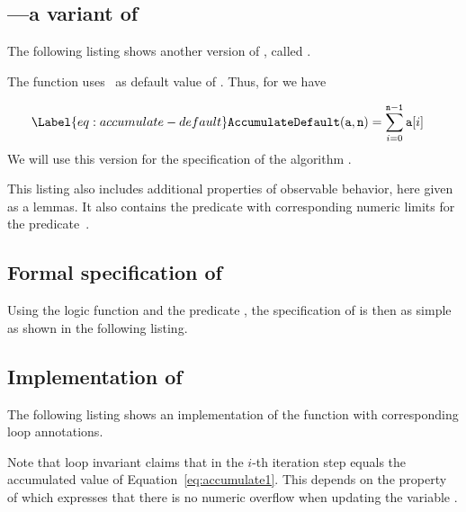 
\subsection{\AccumulateDefault ---a variant of \Accumulate}

The following listing shows another version of ,
called .



The function \AccumulateDefault uses~ as default value of .
Thus, for \AccumulateDefault we have

\begin{align}
\Label{eq:accumulate-default}
    \mathtt{AccumulateDefault}(\mathtt{a}, \mathtt{n})
    &= \sum_{i = 0}^{\mathtt{n-1}} \mathtt{a}[i]
\end{align}
We will use this version for the specification of the algorithm .

This listing also includes additional properties of observable
\AccumulateDefault behavior, here given as a lemmas.
It also contains the predicate 
with corresponding numeric limits for the predicate~\AccumulateDefault.


\subsection{Formal specification of \accumulate}

Using the logic function \Accumulate and the predicate \AccumulateBounds,
the specification of \accumulate is then as simple
as shown in the following listing.



\clearpage

\subsection{Implementation of \accumulate}

The following listing shows an implementation of the
\accumulate function with corresponding loop annotations.



Note that loop invariant  claims that in the $i$-th iteration step 
equals the accumulated value of Equation~\eqref{eq:accumulate1}.
This depends on the property  of  which expresses that
there is no numeric overflow when updating the variable .

\clearpage
